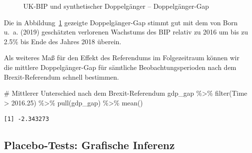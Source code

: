 \documentclass[
  a4paper,
  DIV=11,
  oneside]{scrreprt}
\newenvironment{Shaded}{\begin{snugshade}}{\end{snugshade}}
\newcommand{\CommentTok}[1]{\textcolor[rgb]{0.37,0.37,0.37}{#1}}
\newcommand{\FloatTok}[1]{\textcolor[rgb]{0.68,0.00,0.00}{#1}}
\newcommand{\FunctionTok}[1]{\textcolor[rgb]{0.28,0.35,0.67}{#1}}
\newcommand{\NormalTok}[1]{\textcolor[rgb]{0.00,0.23,0.31}{#1}}
\newcommand{\SpecialCharTok}[1]{\textcolor[rgb]{0.37,0.37,0.37}{#1}}
\begin{document}
\begin{figure}[t]


\caption{\label{fig-ukdggap}UK-BIP und synthetischer Doppelgänger --
Doppelgänger-Gap}

\end{figure}%

Die in Abbildung~\ref{fig-ukdggap} gezeigte Doppelgänger-Gap stimmt gut
mit dem von Born u.~a. (2019) geschätzten verlorenen Wachstums des BIP
relativ zu 2016 um bis zu 2.5\% bis Ende des Jahres 2018 überein.

Als weiteres Maß für den Effekt des Referendums im Folgezeitraum können
wir die mittlere Doppelgänger-Gap für sämtliche Beobachtungsperioden
nach dem Brexit-Referendum schnell bestimmen.

\begin{Shaded}
\begin{Highlighting}[]
\CommentTok{\# Mittlerer Unterschied nach dem Brexit{-}Referendum}
\NormalTok{gdp\_gap }\SpecialCharTok{\%\textgreater{}\%} 
  \FunctionTok{filter}\NormalTok{(Time }\SpecialCharTok{\textgreater{}} \FloatTok{2016.25}\NormalTok{) }\SpecialCharTok{\%\textgreater{}\%} 
  \FunctionTok{pull}\NormalTok{(gdp\_gap) }\SpecialCharTok{\%\textgreater{}\%} 
  \FunctionTok{mean}\NormalTok{()}
\end{Highlighting}
\end{Shaded}

\begin{verbatim}
[1] -2.343273
\end{verbatim}

\subsection{Placebo-Tests: Grafische
Inferenz}\label{placebo-tests-grafische-inferenz}
\end{document}
